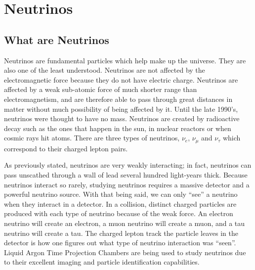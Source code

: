 \chapter{Neutrinos}\label{ch:neutrinos}

\section{What are Neutrinos}
Neutrinos are fundamental particles which help make up the universe. They are also one of the least understood. Neutrinos are not affected by the electromagnetic force because they do not have electric charge. Neutrinos are affected by a weak sub-atomic force of much shorter range than electromagnetism, and are therefore able to pass through great distances in matter without much possibility of being affected by it. Until the late 1990's, neutrinos were thought to have no mass. Neutrinos are created by radioactive decay such as the ones that happen in the sun, in nuclear reactors or when cosmic rays hit atoms. There are three types of neutrinos, $\nu_{e}$, $\nu_{\mu}$ and $\nu_{\tau}$ which correspond to their charged lepton pairs.  

As previously stated, neutrinos are very weakly interacting; in fact, neutrinos can pass unscathed through a wall of lead several hundred light-years thick. Because neutrinos interact so rarely, studying neutrinos requires a massive detector and a powerful neutrino source. With that being said, we can only ``see'' a neutrino when they interact in a detector. In a collision, distinct charged particles are produced with each type of neutrino because of the weak force. An electron neutrino will create an electron, a muon neutrino will create a muon, and a tau neutrino will create a tau. The charged lepton track the particle leaves in the detector is how one figures out what type of neutrino interaction was ``seen''. Liquid Argon Time Projection Chambers are being used to study neutrinos due to their excellent imaging and particle identification capabilities. 

